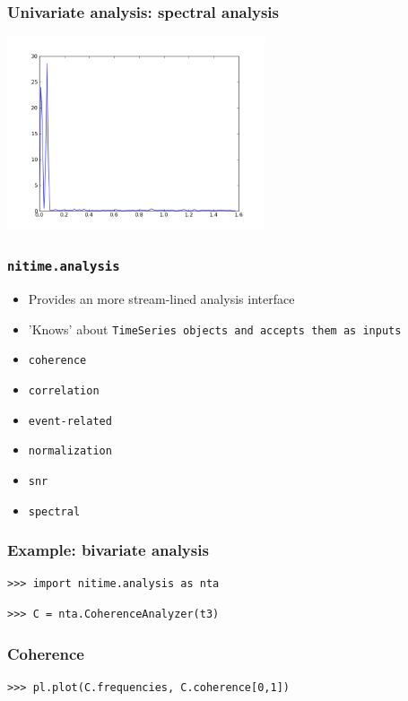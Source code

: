 \documentclass{beamer}
\begin{document}
\begin{frame}
\frametitle{Univariate analysis: spectral analysis}
\includegraphics[height=5.7cm]{figures/outa_phase_tseries_single_psd}
\end{frame}

\begin{frame}
\frametitle{\tt{nitime.analysis}}
\begin{itemize}
\pause
\item 
Provides an more stream-lined analysis interface
\pause
\item 
'Knows' about \tt{TimeSeries} 
objects and accepts them as inputs
\pause
\item
\tt{coherence}
\pause
\item
\tt{correlation}
\pause
\item
\tt{event-related}
\pause
\item
\tt{normalization}
\pause
\item
\tt{snr}
\item
\pause
\tt{spectral}
\end{itemize}
\end{frame}

\begin{frame}[fragile]
\frametitle{Example: bivariate analysis}
\pause
\begin{lstlisting}
>>> import nitime.analysis as nta
\end{lstlisting}
\pause
\begin{lstlisting}
>>> C = nta.CoherenceAnalyzer(t3)
\end{lstlisting}
\end{frame}

\begin{frame}[fragile]
\frametitle{Coherence}
\begin{lstlisting}
>>> pl.plot(C.frequencies, C.coherence[0,1])
\end{lstlisting}
\end{frame}
\end{document}
